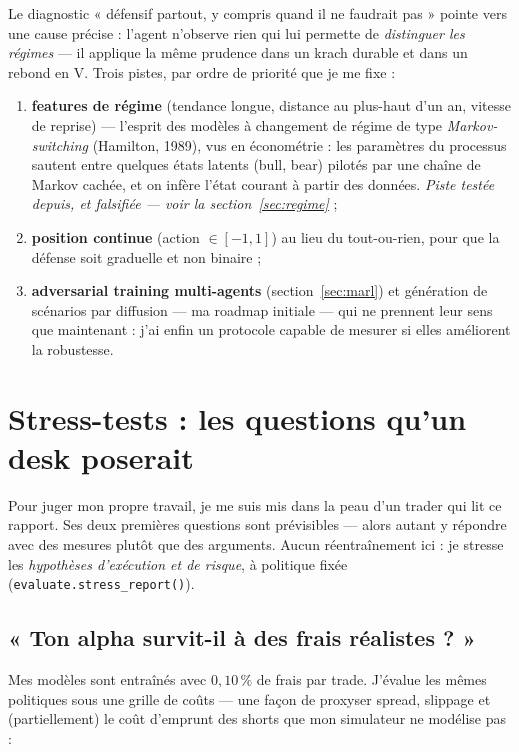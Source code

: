 \documentclass[11pt,a4paper]{article}
\newcommand{\code}[1]{\texttt{#1}}
\begin{document}
Le diagnostic « défensif partout, y compris quand il ne faudrait pas » pointe vers une
cause précise : l'agent n'observe rien qui lui permette de \emph{distinguer les
régimes} --- il applique la même prudence dans un krach durable et dans un rebond en V.
Trois pistes, par ordre de priorité que je me fixe :
\begin{enumerate}[itemsep=2pt]
  \item \textbf{features de régime} (tendance longue, distance au plus-haut d'un an,
        vitesse de reprise) --- l'esprit des modèles à changement de régime de type
        \emph{Markov-switching} (Hamilton, 1989), vus en économétrie : les paramètres
        du processus sautent entre quelques états latents (bull, bear) pilotés par une
        chaîne de Markov cachée, et on infère l'état courant à partir des données.
        \emph{Piste testée depuis, et falsifiée --- voir la section~\ref{sec:regime}} ;
  \item \textbf{position continue} (action $\in [-1, 1]$) au lieu du tout-ou-rien, pour
        que la défense soit graduelle et non binaire ;
  \item \textbf{adversarial training multi-agents} (section~\ref{sec:marl}) et
        génération de scénarios par diffusion --- ma roadmap initiale --- qui ne
        prennent leur sens que maintenant : j'ai enfin un protocole capable de mesurer
        si elles améliorent la robustesse.
\end{enumerate}

\section{Stress-tests : les questions qu'un desk poserait}
\label{sec:stress}

Pour juger mon propre travail, je me suis mis dans la peau d'un trader qui lit ce
rapport. Ses deux premières questions sont prévisibles --- alors autant y répondre avec
des mesures plutôt que des arguments. Aucun réentraînement ici : je stresse les
\emph{hypothèses d'exécution et de risque}, à politique fixée
(\code{evaluate.stress\_report()}).

\subsection{« Ton alpha survit-il à des frais réalistes ? »}

Mes modèles sont entraînés avec $0{,}10\,\%$ de frais par trade. J'évalue les mêmes
politiques sous une grille de coûts --- une façon de proxyser spread, slippage et
(partiellement) le coût d'emprunt des shorts que mon simulateur ne modélise pas :
\end{document}
